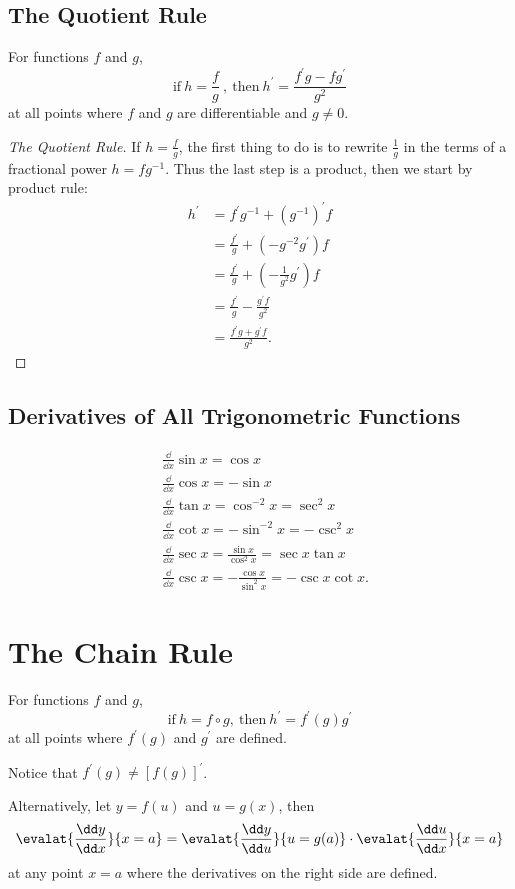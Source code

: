 \subsection{The Quotient Rule}
For functions $f$ and $g$,
\[\text{if}\ h=\frac f g\ ,\ \text{then}\ h^\prime=\frac{f^\prime g-fg^\prime}{g^2}\] at all points where $f$ and $g$ are differentiable and $g\neq0$.
\begin{proof}[The Quotient Rule]
If $h=\frac f g$, the first thing to do is to rewrite $\frac 1 g$ in the terms of a fractional power $h=fg^{-1}$. Thus the last step is a product, then we start by product rule:
    \begin{align*}
        h^\prime & =f^\prime g^{-1}+(g^{-1})^\prime f\\
                 & =\frac{f^\prime}g+(-g^{-2}g^\prime)f\\
                 & =\frac{f^\prime}g+\left(-\frac1{g^2}g^\prime\right)f\\
                 & =\frac{f^\prime}g-\frac{g^\prime f}{g^2}\\
                 & =\frac{f^\prime g+g^\prime f}{g^2}.
    \end{align*}
\end{proof}

\subsection{Derivatives of All Trigonometric Functions}
\begin{align*}
  & \frac\dd{\dd x}\sin x=\cos x\\
  & \frac\dd{\dd x}\cos x=-\sin x\\
  & \frac\dd{\dd x}\tan x=\cos^{-2}x=\sec^2 x\\
  & \frac\dd{\dd x}\cot x=-\sin^{-2}x=-\csc^2 x\\
  & \frac\dd{\dd x}\sec x=\frac{\sin x}{\cos^2 x}=\sec x\tan x\\
  & \frac\dd{\dd x}\csc x=-\frac{\cos x}{\sin^2 x}=-\csc x\cot x.
\end{align*}

\section{The Chain Rule}
For functions $f$ and $g$,
\[\text{if}\ h=f\circ g,\ \text{then}\ h^\prime=f^\prime(g)g^\prime\]
at all points where $f^\prime(g)$ and $g^\prime$ are defined.
\begin{note}Notice that $f^\prime(g)\neq[f(g)]^\prime $.\end{note}
Alternatively, let $y=f(u)$ and $u=g(x)$, then
\[
\evalat{\frac{\dd y}{\dd x}}{x=a}=\evalat{\frac{\dd y}{\dd u}}{u=g(a)}\cdot\evalat{\frac{\dd u}{\dd x}}{x=a}
\]
at any point $x=a$ where the derivatives on the right side are defined.

